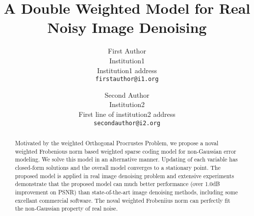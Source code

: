 \documentclass[10pt,twocolumn,letterpaper]{article}
\begin{document}
\title{A Double Weighted Model for Real Noisy Image Denoising}

\author{First Author\\
Institution1\\
Institution1 address\\
{\tt\small firstauthor@i1.org}
\and
Second Author\\
Institution2\\
First line of institution2 address\\
{\tt\small secondauthor@i2.org}
}

\maketitle


\begin{abstract}
Motivated by the weighted Orthogonal Procrustes Problem, we propose a noval weighted Frobenious norm based weighted sparse coding model for non-Gaussian error modeling. We solve this model in an alternative manner. Updating of each variable has closed-form solutions and the overall model converges to a stationary point. The proposed model is applied in real image denoising problem and extensive experiments demonstrate that the proposed model can much better performance (over 1.0dB improvement on PSNR) than state-of-the-art image denoising methods, including some excellant commercial software. The noval weighted Frobeniius norm can perfectly fit the non-Gaussian property of real noise.
\end{abstract}

\end{document}
